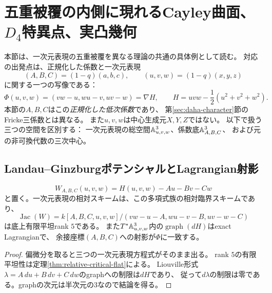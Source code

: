 \section{五重被覆の内側に現れるCayley曲面、\texorpdfstring{$D_4$}{D4}特異点、実凸幾何}
\label{sec:cayley-lg-connections}
本節は、一次元表現の五重被覆を異なる理論の共通の具体例として読む。
対応の出発点は、正規化した係数と一次元表現
\[
 (A,B,C)=(1-q)(a,b,c),\qquad (u,v,w)=(1-q)(x,y,z)
\]
に関する一つの写像である：
\begin{equation}\label{eq:cayley-gradient-map}
 \Phi(u,v,w)=(vw-u,wu-v,uv-w)=\nabla H,
 \qquad H=uvw-\frac12(u^2+v^2+w^2).
\end{equation}
本節の$A,B,C$はこの\emph{正規化した低次係数}であり、
第\ref{sec:daha-character}節のFricke三係数とは異なる。
また$u,v,w$は中心生成元$X,Y,Z$ではない。
以下で扱う三つの空間を区別する：
一次元表現の総空間$\AA^3_{u,v,w}$、係数底$\AA^3_{A,B,C}$、
および元の非可換代数の三次中心。

\subsection{Landau--GinzburgポテンシャルとLagrangian射影}
\begin{proposition}[一次元表現は五つの臨界点を与える]
\label{prop:lg-character-potential}
\[
 W_{A,B,C}(u,v,w)=H(u,v,w)-Au-Bv-Cw
\]
と置く。一次元表現の相対スキームは、この多項式族の相対臨界スキームであり、
\[
 \operatorname{Jac}(W)=
 k[A,B,C,u,v,w]/(vw-u-A,wu-v-B,uv-w-C)
\]
は底上有限平坦rank $5$である。
また$T^*\AA^3_{u,v,w}$内の$\operatorname{graph}(dH)$はexact Lagrangianで、
余接座標$(A,B,C)$への射影が$\Phi$に一致する。
\end{proposition}
\begin{proof}
偏微分を取ると三つの一次元表現方程式がそのまま出る。
rank $5$の有限平坦性は定理\ref{thm:relative-critical-flat}による。
Liouville形式$\lambda=A\,du+B\,dv+C\,dw$のgraphへの制限は$dH$であり、
従って$d\lambda$の制限は零である。graphの次元は半次元の$3$なので結論を得る。
\end{proof}

